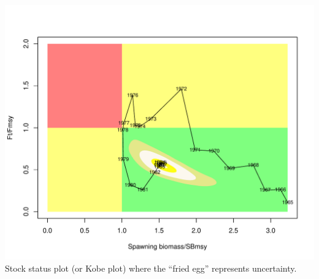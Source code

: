 \begin{multicols}{2}
\begin{figurehere}
	\centering
	\includegraphics[width=0.9\columnwidth]{iscamFigs/NhakeKobeplot.pdf}\\
	\caption{Stock status plot (or Kobe plot) where the ``fried egg'' represents uncertainty.}\label{fig7}
\end{figurehere}

\end{multicols}



